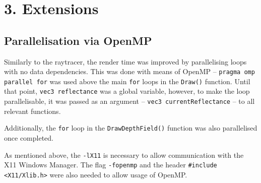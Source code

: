 \documentclass[DIV=calc, paper=a4, fontsize=11pt, twocolumn]{article}	 %
\begin{document}
	\section*{3. Extensions}
	\subsection*{Parallelisation via OpenMP}
	Similarly to the raytracer, the render time was improved by parallelising loops with no data dependencies. This was done with means of OpenMP -- \texttt{pragma omp parallel for} was used above the main \texttt{for} loops in the \texttt{Draw()} function. Until that point, \texttt{vec3 reflectance} was a global variable, however, to make the loop parallelisable, it was passed as an argument -- \texttt{vec3 currentReflectance} -- to all relevant functions.
	\par
	Additionally, the \texttt{for} loop in the \texttt{DrawDepthField()} function was also parallelised once completed.
	\par
	As mentioned above, the \texttt{-lX11} is necessary to allow communication with the X11 Windows Manager. The flag \texttt{-fopenmp} and the header \texttt{\#include <X11/Xlib.h>} were also needed to allow usage of OpenMP.

	
\end{document}
